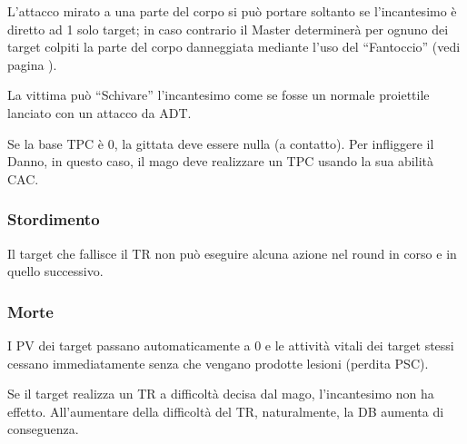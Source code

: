 L'attacco mirato a una parte del corpo si pu\`o portare soltanto se
l'incantesimo \`e diretto ad 1 solo target; in caso contrario il
Master determiner\`a per ognuno dei target colpiti la parte del corpo
danneggiata mediante l'uso del ``Fantoccio'' (vedi pagina
\pageref{fantoccio}).

La vittima pu\`o ``Schivare'' l'incantesimo come se fosse
un normale proiettile lanciato con un attacco da ADT. 

Se la base TPC \`e 0, la gittata deve essere nulla (a contatto). Per
infliggere il Danno, in questo caso, il mago deve realizzare un TPC
usando la sua abilit\`a CAC.




\subsubsection{Stordimento}
Il target che fallisce il TR non pu\`o eseguire alcuna azione nel round in
corso e in quello successivo.




\subsubsection{Morte} 

I PV dei target passano automaticamente a 0 e le attivit\`a vitali dei target
stessi cessano immediatamente senza che vengano prodotte lesioni (perdita PSC).

Se il target realizza un TR a difficolt\`a decisa dal mago,
l'incantesimo non ha effetto. All'aumentare della difficolt\`a del TR,
naturalmente, la DB aumenta di conseguenza.

